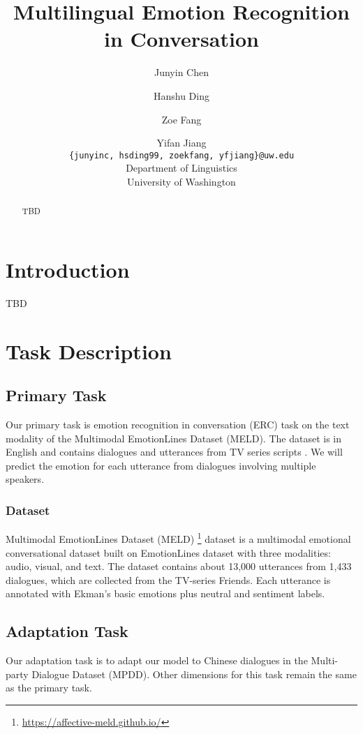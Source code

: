 \documentclass[11pt]{article}
\title{Multilingual Emotion Recognition in Conversation}
\author{Junyin Chen \and Hanshu Ding \and Zoe Fang \and Yifan Jiang \\
		\texttt{\{junyinc, hsding99, zoekfang, yfjiang\}@uw.edu} \\
        Department of Linguistics \\ University of Washington}
\begin{document}
\maketitle
\begin{abstract}
  TBD
\end{abstract}

\section{Introduction}
TBD

\section{Task Description}

\subsection{Primary Task}
\label{sect:primary_task}

Our primary task is emotion recognition in conversation (ERC) task on the text modality of the Multimodal EmotionLines Dataset (MELD). The dataset is in English and contains dialogues and utterances from TV series scripts . We will predict the emotion for each utterance from dialogues involving multiple speakers.

\subsubsection{Dataset}

Multimodal EmotionLines Dataset (MELD) \citep{poria-etal-2019-meld} \footnote{\url{https://affective-meld.github.io/}} dataset is a multimodal emotional conversational dataset built on EmotionLines dataset \citep{hsu-etal-2018-emotionlines} with three modalities: audio, visual, and text. The dataset contains about 13,000 utterances from 1,433 dialogues, which are collected from the TV-series Friends. Each utterance is annotated with Ekman's basic emotions plus neutral and sentiment labels.

\subsection{Adaptation Task}
\label{sect:adaptation_task}

Our adaptation task is to adapt our model to Chinese dialogues in the Multi-party Dialogue Dataset (MPDD). Other dimensions for this task remain the same as the primary task.
\end{document}
